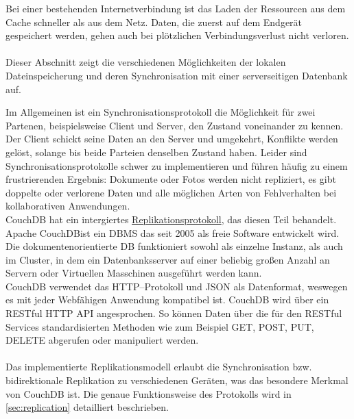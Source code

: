 Bei einer bestehenden Internetverbindung ist das Laden der Ressourcen aus dem Cache schneller als aus dem Netz. Daten, die zuerst auf dem Endgerät gespeichert werden, gehen auch bei plötzlichen Verbindungsverlust nicht verloren. \\\\
Dieser Abschnitt zeigt die verschiedenen Möglichkeiten der lokalen Dateinspeicherung und deren Synchronisation mit einer serverseitigen Datenbank auf.
%
%

%
%

%
%
Im Allgemeinen ist ein Synchronisationsprotokoll die Möglichkeit für zwei Partenen, beispielsweise Client und Server, den Zustand voneinander zu kennen. Der Client schickt seine Daten an den Server und umgekehrt, Konflikte werden gelöst, solange bis beide Parteien denselben Zustand haben.
Leider sind Synchronisationsprotokolle schwer zu implementieren und führen häufig zu einem frustrierenden Ergebnis: Dokumente oder Fotos werden nicht repliziert, es gibt doppelte oder verlorene Daten und alle möglichen Arten von Fehlverhalten bei kollaborativen Anwendungen.\\
CouchDB hat ein intergiertes \hyperref[sec:replication]{Replikationsprotokoll}, das diesen Teil behandelt.  
%
%
Apache CouchDB\tm ist ein \gls{DBMS} das seit 2005 als freie Software entwickelt wird. Die dokumentenorientierte \gls{DB} funktioniert sowohl als einzelne Instanz, als auch im Cluster, in dem ein Datenbanksserver auf einer beliebig großen Anzahl an Servern oder Virtuellen Masschinen ausgeführt werden kann.\\
CouchDB verwendet das \gls{HTTP}--Protokoll und \gls{JSON} als Datenformat, weswegen es mit jeder Webfähigen Anwendung kompatibel ist. CouchDB wird über ein \gls{REST}ful \gls{HTTP} \gls{API} angesprochen. So können Daten über die für den \gls{REST}ful Services standardisierten Methoden wie zum Beispiel GET, POST, PUT, DELETE abgerufen oder manipuliert werden.\\\\
Das implementierte Replikationsmodell erlaubt die Synchronisation bzw. bidirektionale Replikation zu verschiedenen Geräten, was das besondere Merkmal von CouchDB ist. 
Die genaue Funktionsweise des Protokolls wird in \autoref{sec:replication} detailliert beschrieben.\\
